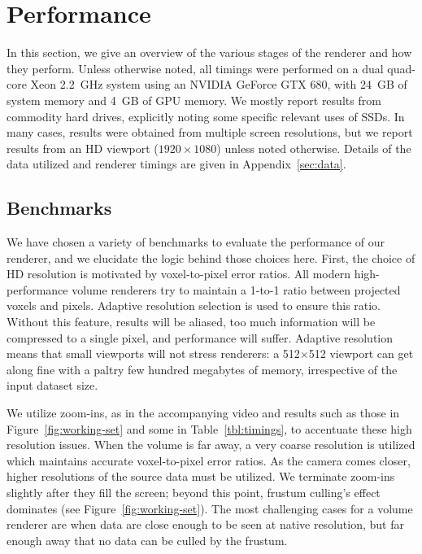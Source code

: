 \section{Performance}
\label{sec:performance}

In this section, we give an overview of the various stages of the
renderer and how they perform.  Unless otherwise noted, all timings
were performed on a dual quad-core Xeon 2.2~GHz system using an NVIDIA
GeForce GTX 680, with 24~GB of system memory and 4~GB of GPU memory.
We mostly report results from commodity hard drives, explicitly noting
some specific relevant uses of SSDs.  In many cases, results were
obtained from multiple screen resolutions, but we report results from
an HD viewport ($1920\times1080$) unless noted otherwise.  Details of
the data utilized and renderer timings are given in
Appendix~\ref{sec:data}.

\subsection{Benchmarks}

We have chosen a variety of benchmarks to evaluate the performance of
our renderer, and we elucidate the logic behind those choices here.
First, the choice of HD resolution is motivated by voxel-to-pixel error
ratios.  All modern high-performance volume renderers try to maintain a
1-to-1 ratio between projected voxels and pixels.  Adaptive resolution
selection is used to ensure this ratio.  Without this feature, results
will be aliased, too much information will be compressed to a single
pixel, and performance will suffer.  Adaptive resolution means that
small viewports will not stress renderers: a 512$\times$512 viewport
can get along fine with a paltry few hundred megabytes of memory,
irrespective of the input dataset size.

We utilize zoom-ins, as in the accompanying video and results such as
those in Figure~\ref{fig:working-set} and some in
Table~\ref{tbl:timings}, to accentuate these high resolution issues.
When the volume is far away, a very coarse resolution is utilized which
maintains accurate voxel-to-pixel error ratios.  As the camera comes
closer, higher resolutions of the source data must be utilized.  We
terminate zoom-ins slightly after they fill the screen; beyond this
point, frustum culling's effect dominates (see
Figure~\ref{fig:working-set}).  The most challenging cases for a
volume renderer are when data are close enough to be seen at native
resolution, but far enough away that no data can be culled by the
frustum.

